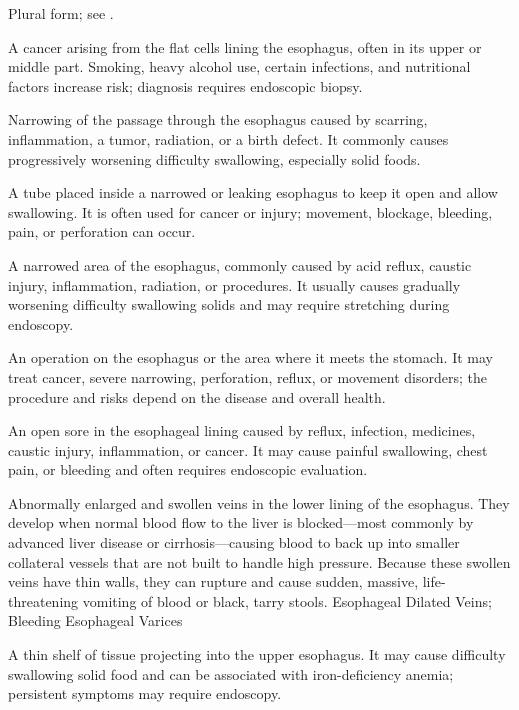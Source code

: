  Plural form; see .

 A cancer arising from the flat cells lining the esophagus, often in its upper or middle part. Smoking, heavy alcohol use, certain infections, and nutritional factors increase risk; diagnosis requires endoscopic biopsy.

 Narrowing of the passage through the esophagus caused by scarring, inflammation, a tumor, radiation, or a birth defect. It commonly causes progressively worsening difficulty swallowing, especially solid foods.

 A tube placed inside a narrowed or leaking esophagus to keep it open and allow swallowing. It is often used for cancer or injury; movement, blockage, bleeding, pain, or perforation can occur.

 A narrowed area of the esophagus, commonly caused by acid reflux, caustic injury, inflammation, radiation, or procedures. It usually causes gradually worsening difficulty swallowing solids and may require stretching during endoscopy.

 An operation on the esophagus or the area where it meets the stomach. It may treat cancer, severe narrowing, perforation, reflux, or movement disorders; the procedure and risks depend on the disease and overall health.

 An open sore in the esophageal lining caused by reflux, infection, medicines, caustic injury, inflammation, or cancer. It may cause painful swallowing, chest pain, or bleeding and often requires endoscopic evaluation.

 Abnormally enlarged and swollen veins in the lower lining of the esophagus. They develop when normal blood flow to the liver is blocked---most commonly by advanced liver disease or cirrhosis---causing blood to back up into smaller collateral vessels that are not built to handle high pressure. Because these swollen veins have thin walls, they can rupture and cause sudden, massive, life-threatening vomiting of blood or black, tarry stools.
\synonyms
Esophageal Dilated Veins; Bleeding Esophageal Varices

 A thin shelf of tissue projecting into the upper esophagus. It may cause difficulty swallowing solid food and can be associated with iron-deficiency anemia; persistent symptoms may require endoscopy.

